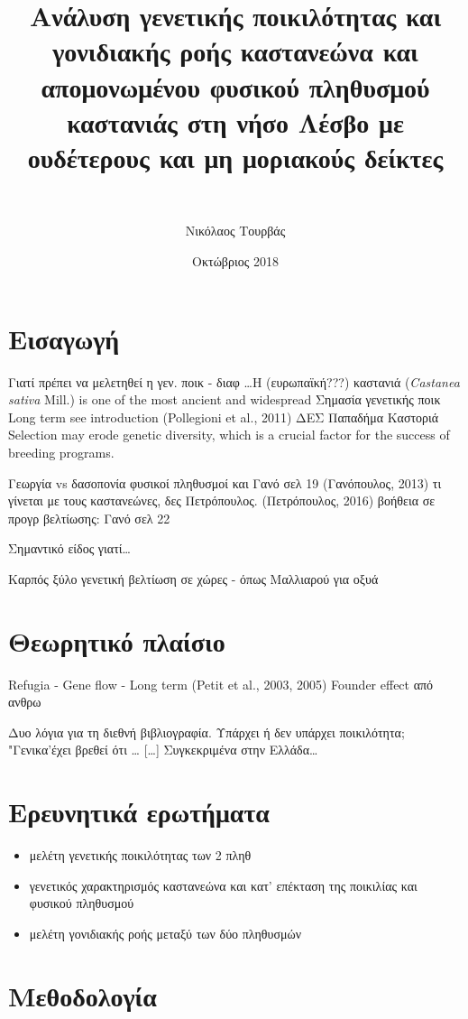 \documentclass[12pt,a4paper,]{report}
\title{Ανάλυση γενετικής ποικιλότητας και γονιδιακής ροής καστανεώνα και
απομονωμένου φυσικού πληθυσμού καστανιάς στη νήσο Λέσβο με ουδέτερους
και μη μοριακούς δείκτες}
\subtitle{~}
\author{Νικόλαος Τουρβάς}
\date{Οκτώβριος 2018}
\providecommand{\tightlist}{%
  \setlength{\itemsep}{0pt}\setlength{\parskip}{0pt}}
\begin{document}
\maketitle

\section{Εισαγωγή}

Γιατί πρέπει να μελετηθεί η γεν. ποικ - διαφ \ldots{}Η (ευρωπαϊκή???)
καστανιά (\emph{Castanea sativa} Mill.) is one of the most ancient and
widespread Σημασία γενετικής ποικ Long term see introduction (Pollegioni
et al., 2011) ΔΕΣ Παπαδήμα Καστοριά Selection may erode genetic
diversity, which is a crucial factor for the success of breeding
programs.

Γεωργία vs δασοπονία φυσικοί πληθυσμοί και Γανό σελ 19 (Γανόπουλος,
2013) τι γίνεται με τους καστανεώνες, δες Πετρόπουλος. (Πετρόπουλος,
2016) βοήθεια σε προγρ βελτίωσης: Γανό σελ 22

Σημαντικό είδος γιατί\ldots{}

Καρπός ξύλο γενετική βελτίωση σε χώρες - όπως Μαλλιαρού για οξυά

\hypertarget{-}{%
\section{Θεωρητικό πλαίσιο}\label{-}}

Refugia - Gene flow - Long term (Petit et al., 2003, 2005) Founder
effect από ανθρω

Δυο λόγια για τη διεθνή βιβλιογραφία. Υπάρχει ή δεν υπάρχει ποικιλότητα;
"Γενικα'έχει βρεθεί ότι \ldots{} {[}\ldots{}{]} Συγκεκριμένα στην
Ελλάδα\ldots{}

\hypertarget{-}{%
\section{Ερευνητικά ερωτήματα}\label{-}}

\begin{itemize}
\tightlist
\item
  μελέτη γενετικής ποικιλότητας των 2 πληθ
\item
  γενετικός χαρακτηρισμός καστανεώνα και κατ' επέκταση της ποικιλίας και
  φυσικού πληθυσμού
\item
  μελέτη γονιδιακής ροής μεταξύ των δύο πληθυσμών
\end{itemize}

\section{Μεθοδολογία}
\end{document}
